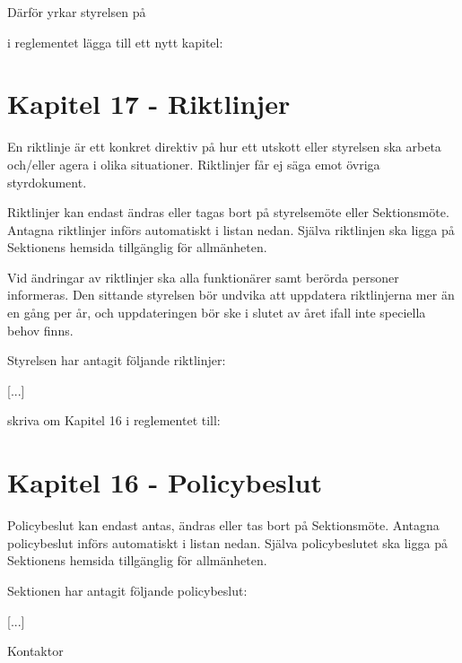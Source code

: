 \documentclass[../_main/handlingar.tex]{subfiles}
\begin{document}
Därför yrkar styrelsen på
\begin{attsatser}
    \att i reglementet lägga till ett nytt kapitel:\par
    {\it
    \vspace*{-\baselineskip}
    \section*{Kapitel 17 - Riktlinjer}
    En riktlinje är ett konkret direktiv på hur ett utskott eller styrelsen ska arbeta och/eller agera i olika situationer. Riktlinjer får ej säga emot övriga styrdokument.

    Riktlinjer kan endast ändras eller tagas bort på styrelsemöte eller Sektionsmöte. Antagna riktlinjer införs automatiskt i listan nedan. Själva riktlinjen ska ligga på Sektionens hemsida tillgänglig för allmänheten.

    Vid ändringar av riktlinjer ska alla funktionärer samt berörda personer informeras. Den sittande styrelsen bör undvika att uppdatera riktlinjerna mer än en gång per år, och uppdateringen bör ske i slutet av året ifall inte speciella behov finns.

    Styrelsen har antagit följande riktlinjer:
    \begin{dashlist}
        \item {[...]}
    \end{dashlist}
    }
    \att skriva om Kapitel 16 i reglementet till:\par
    {\it
    \vspace*{-\baselineskip}
    \section*{Kapitel 16 - Policybeslut}
    Policybeslut kan endast antas, ändras eller tas bort på Sektionsmöte. Antagna policybeslut införs automatiskt i listan nedan. Själva policybeslutet ska ligga på Sektionens hemsida tillgänglig för allmänheten.

    Sektionen har antagit följande policybeslut:
    \begin{dashlist}
        \item {[...]}
    \end{dashlist}
    }
\end{attsatser}

\begin{signatures}{1}
    \ist
    \signature{Erik Månsson}{Kontaktor}
\end{signatures}
\end{document}
